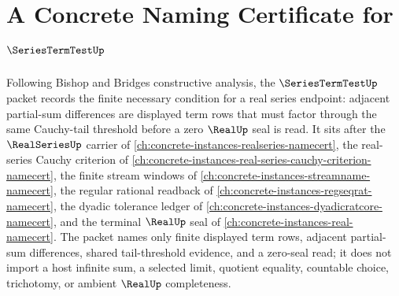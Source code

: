 \chapter{A Concrete Naming Certificate for $\SeriesTermTestUp$}
\label{ch:concrete-instances-series-term-test-namecert}

Following Bishop and Bridges constructive analysis, the $\SeriesTermTestUp$ packet records the finite necessary condition for a real series endpoint: adjacent partial-sum differences are displayed term rows that must factor through the same Cauchy-tail threshold before a zero $\RealUp$ seal is read. It sits after the $\RealSeriesUp$ carrier of \autoref{ch:concrete-instances-realseries-namecert}, the real-series Cauchy criterion of \autoref{ch:concrete-instances-real-series-cauchy-criterion-namecert}, the finite stream windows of \autoref{ch:concrete-instances-streamname-namecert}, the regular rational readback of \autoref{ch:concrete-instances-regseqrat-namecert}, the dyadic tolerance ledger of \autoref{ch:concrete-instances-dyadicratcore-namecert}, and the terminal $\RealUp$ seal of \autoref{ch:concrete-instances-real-namecert}. The packet names only finite displayed term rows, adjacent partial-sum differences, shared tail-threshold evidence, and a zero-seal read; it does not import a host infinite sum, a selected limit, quotient equality, countable choice, trichotomy, or ambient $\RealUp$ completeness.

